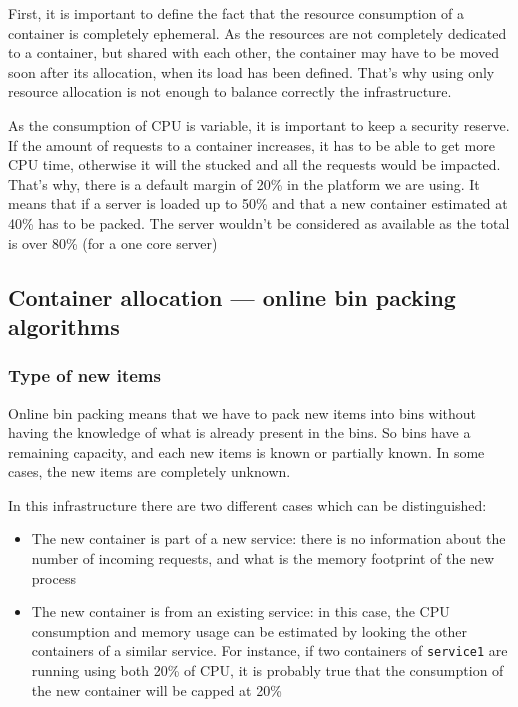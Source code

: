 First, it is important to define the fact that the resource consumption of a
container is completely ephemeral. As the resources are not completely
dedicated to a container, but shared with each other, the container may have
to be moved soon after its allocation, when its load has been defined. That's
why using only resource allocation is not enough to balance correctly the
infrastructure.

As the consumption of CPU is variable, it is important to keep a security
reserve. If the amount of requests to a container increases, it has to be
able to get more CPU time, otherwise it will the stucked and all the requests
would be impacted. That's why, there is a default margin of 20\% in the
platform we are using. It means that if a server is loaded up to 50\% and
that a new container estimated at 40\% has to be packed. The server wouldn't
be considered as available as the total is over 80\% (for a one core server)

\subsection{Container allocation --- online bin packing algorithms}

\subsubsection{Type of new items}

Online bin packing means that we have to pack new items into bins without
having the knowledge of what is already present in the bins. So bins have a
remaining capacity, and each new items is known or partially known. In some
cases, the new items are completely unknown.

In this infrastructure there are two different cases which can be distinguished:

\begin{itemize}
\item{The new container is part of a new service: there is no information about
the number of incoming requests, and what is the memory footprint of the new process}
\item{The new container is from an existing service: in this case, the CPU consumption
and memory usage can be estimated by looking the other containers of a similar service.
For instance, if two containers of \texttt{service1} are running using both 20\% of CPU,
it is probably true that the consumption of the new container will be capped at 20\%}
\end{itemize}

